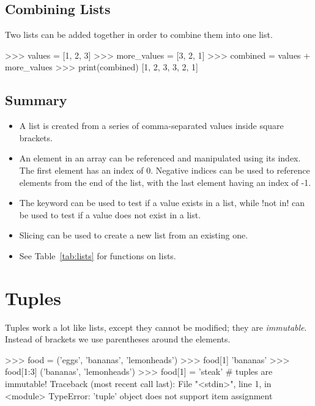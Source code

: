 \documentclass[11pt]{cselabheader}
\begin{document}
\subsection{Combining Lists}
Two lists can be added together in order to combine them into one list.

\begin{pyconcode}
>>> values = [1, 2, 3]
>>> more_values = [3, 2, 1]
>>> combined = values + more_values
>>> print(combined)
[1, 2, 3, 3, 2, 1]
\end{pyconcode}

\subsection{Summary}

\begin{itemize}
  \item A list is created from a series of comma-separated values inside square
    brackets.  
  \item An element in an array can be referenced and manipulated
    using its index. The first element has an index of 0. Negative indices can
    be used to reference elements from the end of the list, with the last
    element having an index of -1.
  \item The  keyword can be used to test if a value exists in a
    list, while \pythoninline!not in! can be used to test if a value does not exist
    in a list.
  \item Slicing can be used to create a new list from an existing one.
  \item See Table~\ref{tab:lists} for functions on lists.
\end{itemize}

\pagebreak
\section{Tuples}

Tuples work a lot like lists, except they cannot be modified; they are
\emph{immutable}. Instead of brackets \pythoninline{[]} we use parentheses
\pythoninline{()} around the elements.

\begin{pyconcode}
>>> food = ('eggs', 'bananas', 'lemonheads')
>>> food[1]
'bananas'
>>> food[1:3]
('bananas', 'lemonheads')
>>> food[1] = 'steak' # tuples are immutable!
Traceback (most recent call last):
  File "<stdin>", line 1, in <module>
TypeError: 'tuple' object does not support item assignment
\end{pyconcode}
\end{document}

